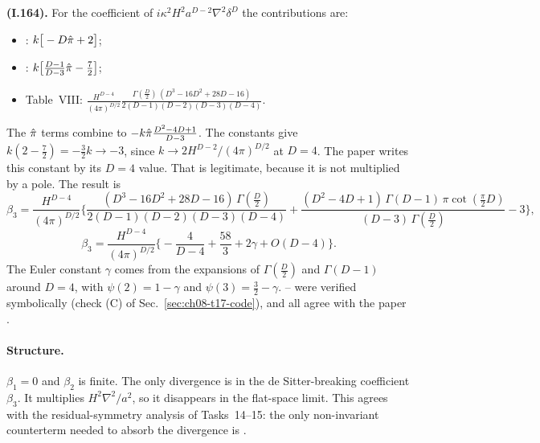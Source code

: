 \textbf{(I.164).} For the coefficient of $i\kappa^2H^2a^{D-2}\nabla^2\delta^D$ the contributions are:
\begin{itemize}[itemsep=1pt]
\item {}: $k\big[-D\hat\pi+2\big]$;
\item {}: $k\big[\tfrac{D-1}{D-3}\hat\pi-\tfrac72\big]$;
\item Table~VIII: $\frac{H^{D-4}}{(4\pi)^{D/2}}\frac{\Gamma(\frac D2)\,(D^3-16D^2+28D-16)}{2(D-1)(D-2)(D-3)(D-4)}$.
\end{itemize}
The $\hat\pi$ terms combine to $-k\hat\pi\frac{D^2-4D+1}{D-3}$.
The constants give $k(2-\tfrac72)=-\tfrac32k\to-3$, since $k\to2H^{D-2}/(4\pi)^{D/2}$ at $D=4$.
The paper writes this constant by its $D=4$ value. That is legitimate, because it is not multiplied by a pole. The result is
\begin{equation}
\beta_3=\frac{H^{D-4}}{(4\pi)^{D/2}}\Big\{\frac{(D^3-16D^2+28D-16)\,\Gamma(\frac D2)}{2(D-1)(D-2)(D-3)(D-4)}+\frac{(D^2-4D+1)\,\Gamma(D-1)\,\pi\cot(\frac\pi2D)}{(D-3)\,\Gamma(\frac D2)}-3\Big\},
\tag{I.164}
\end{equation}
\begin{equation}
\beta_3=\frac{H^{D-4}}{(4\pi)^{D/2}}\Big\{-\frac{4}{D-4}+\frac{58}{3}+2\gamma+O(D-4)\Big\}.
\tag{I.165}
\end{equation}
The Euler constant $\gamma$ comes from the expansions of $\Gamma(\tfrac D2)$ and $\Gamma(D-1)$ around $D=4$, with $\psi(2)=1-\gamma$ and $\psi(3)=\tfrac32-\gamma$.
-- were verified symbolically (check (C) of Sec.~\ref{sec:ch08-t17-code}), and all agree with the paper \chEok.

\paragraph{Structure.} $\beta_1=0$ and $\beta_2$ is finite. The only divergence is in the de Sitter-breaking coefficient $\beta_3$.
It multiplies $H^2\nabla^2/a^2$, so it disappears in the flat-space limit.
This agrees with the residual-symmetry analysis of Tasks~14--15: the only non-invariant counterterm needed to absorb the divergence is .

